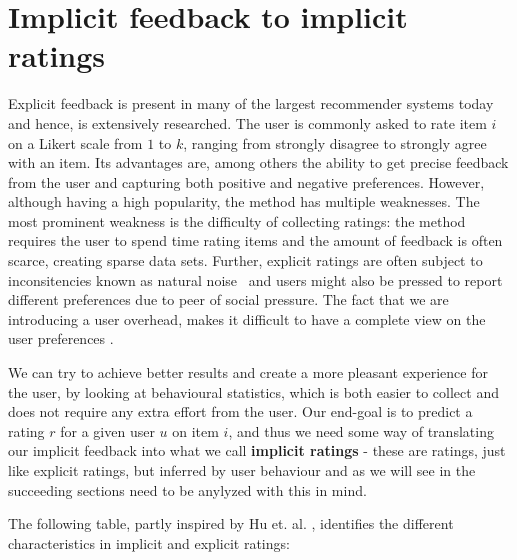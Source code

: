 




\section{Implicit feedback to implicit ratings}

Explicit feedback is present in many of the largest recommender systems today
and hence, is extensively researched. The user is commonly asked to
rate item $i$ on a Likert scale from $1$ to $k$, ranging from strongly
disagree to strongly agree with an item. Its advantages are, among others the
ability to get precise feedback from the user and capturing both positive and
negative preferences. However, although having a high popularity, the method
has multiple weaknesses. The most prominent weakness is the difficulty of
collecting ratings: the method requires the user to spend time rating items and
the amount of feedback is often scarce, creating sparse data sets. Further,
explicit ratings are often subject to inconsitencies known as natural
noise \cite{amatriain2009like} and users might also be pressed to report
different preferences due to peer of social pressure. The fact that we are
introducing a user overhead, makes it difficult to have a complete view on the
user preferences \cite{jawaheer2010characterisation}.

We can try to achieve better results and create a more pleasant experience for
the user, by looking at behavioural statistics, which is both easier to collect
and does not require any extra effort from the user. Our end-goal is to predict
a rating $r$ for a given user $u$ on item $i$, and thus we need some way of
translating our implicit feedback into what we call \textbf{implicit ratings} -
these are ratings, just like explicit ratings, but inferred by user behaviour
and as we will see in the succeeding sections need to be anylyzed with this in
mind.

The following table, partly inspired by Hu et. al. \cite{Hu2008}, identifies
the different characteristics in implicit and explicit ratings:

